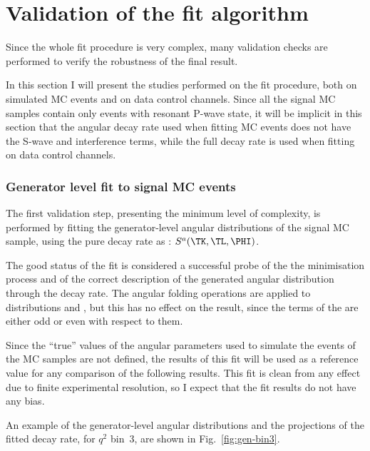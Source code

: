 \chapter{Validation of the fit algorithm}
\label{sec:validation}

Since the whole fit procedure is very complex, many validation checks are performed to verify the robustness of the final result.

In this section I will present the studies performed on the fit procedure, both on simulated MC events and on data control channels.
Since all the signal MC samples contain only events with resonant P-wave \PKpi state, it will be implicit in this section that the angular decay rate used when fitting MC events does not have the S-wave and interference terms, while the full decay rate is used when fitting on data control channels.

\subsection{Generator level fit to signal MC events}
\label{sec:fitval-gen}

The first validation step, presenting the minimum level of complexity, is performed by fitting the generator-level angular distributions of the signal MC sample, using the pure decay rate as \pdf: $S^a(\TK,\TL,\PHI)$.

The good status of the fit is considered a successful probe of the the minimisation process and of the correct description of the generated angular distribution through the decay rate.
The angular folding operations are applied to distributions and \pdfs, but this has no effect on the result, since the terms of the \pdf are either odd or even with respect to them.

Since the ``true'' values of the angular parameters used to simulate the events of the MC samples are not defined, the results of this fit will be used as a reference value for any comparison of the following results.
This fit is clean from any effect due to finite experimental resolution, so I expect that the fit results do not have any bias.

An example of the generator-level angular distributions and the projections of the fitted decay rate, for $q^2$ bin~3, are shown in Fig.~\ref{fig:gen-bin3}.


